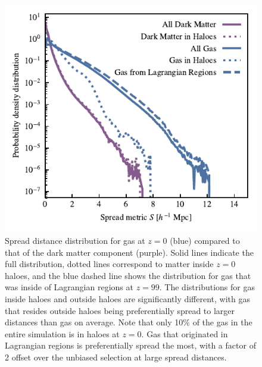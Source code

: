 \begin{figure}
    \centering
    \includegraphics{figures/s50j7kAHF/distance_plot_split_by_component+AHF_updated.pdf}
    \vspace{-0.7cm}
    \caption{Spread distance distribution for gas at $z=0$ (blue) compared to
    that of the dark matter component (purple). Solid lines indicate the full
    distribution, dotted lines correspond to matter inside $z=0$ haloes, and
    the blue dashed line shows the distribution for gas that was inside of
    Lagrangian regions at $z=99$. The distributions for gas inside haloes and
    outside haloes are significantly different, with gas that resides outside
    haloes being preferentially spread to larger distances than gas on
    average. Note that only 10\% of the gas in the entire simulation is in
    haloes at $z=0$. Gas that originated in Lagrangian regions is
    preferentially spread the most, with a factor of 2 offset over the
    unbiased selection at large spread distances.}
    \label{fig:distbaryon}
\end{figure}



